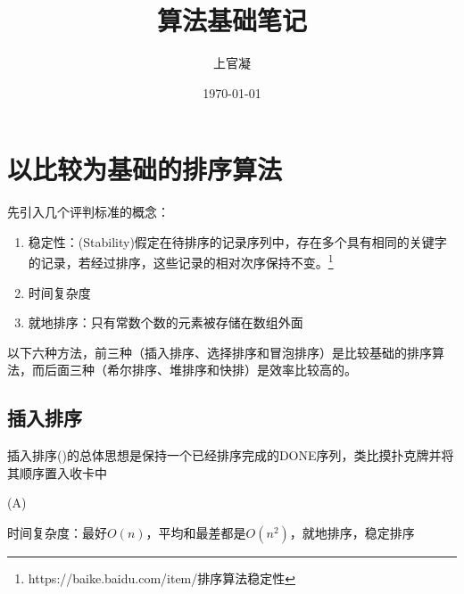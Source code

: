 \documentclass[]{report}
\title{{\huge {算法基础笔记}}}
\author{上官凝}
\date{\today}
\begin{document}
\theoremstyle{definition} \newtheorem{theorem}{Thm}[section] %
\theoremstyle{definition} \newtheorem{definition}{Def}[section] %
\theoremstyle{plain} \newtheorem{lemma}{lemma}[section] %

	\maketitle
	\newpage

	\tableofcontents
	\newpage

	\chapter{以比较为基础的排序算法}
	先引入几个评判标准的概念：
	\begin{enumerate}
		\item 稳定性：(Stability)假定在待排序的记录序列中，存在多个具有相同的关键字的记录，若经过排序，这些记录的相对次序保持不变。\footnote{https://baike.baidu.com/item/排序算法稳定性}
		\item 时间复杂度
		\item 就地排序：只有常数个数的元素被存储在数组外面
	\end{enumerate}
	以下六种方法，前三种（插入排序、选择排序和冒泡排序）是比较基础的排序算法，而后面三种（希尔排序、堆排序和快排）是效率比较高的。
	\section{插入排序}
		插入排序({})的总体思想是保持一个已经排序完成的DONE序列，类比摸扑克牌并将其顺序置入收卡中
		\begin{algorithm}
			\caption{{}(A)}
		\end{algorithm}
		时间复杂度：最好$O(n)$，平均和最差都是$O(n^2)$，就地排序，稳定排序
\end{document}
